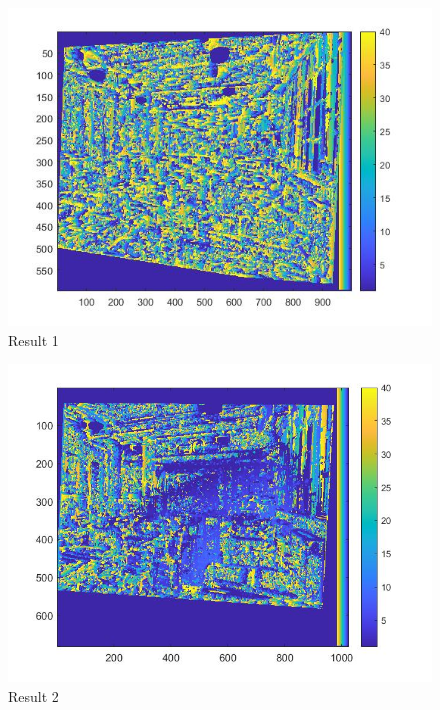 \begin{figure}[h]
    \centering
    \includegraphics[width=13cm]{writeup/box filter.jpg}
    \caption{Result 1}
    \label{fig:result1}
\end{figure}

\begin{figure}[h]
    \centering
    \includegraphics[width=13cm]{writeup/box filter success.jpg}
    \caption{Result 2}
    \label{fig:result2}
\end{figure}

